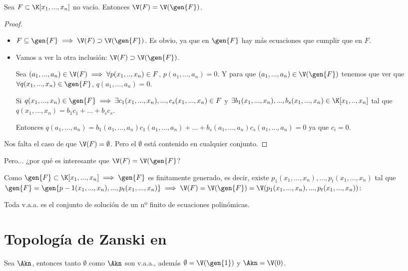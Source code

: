 \begin{prop}
	Sea $F \subset \K[x_1,...,x_n]$ no vacío. Entonces $\V(F)=\V(\gen{F})$.
\end{prop} 

\begin{proof}
	\begin{itemize}
		\item $F \subseteq \gen{F} \implies \V(F) \supset \V(\gen{F})$. Es obvio, ya que en $\gen{F}$ hay más ecuaciones que cumplir que en $F$.
		\item Vamos a ver la otra inclusión: $\V(F) \supset \V(\gen{F})$.
		
		Sea $(a_1,...,a_n) \in \V(F) \implies \forall p(x_1,..,x_n) \in F$, $p(a_1,...,a_n)=0$. Y para que $(a_1,...,a_n) \in \V(\gen{F})$ tenemos que ver que $\forall q(x_1,...,x_n)\in \gen{F}$, $q(a_1,...,a_n)=0$.
		
		Si $q(x_1,...,x_n)\in \gen{F} \implies \exists c_1(x_1,...,x_n),...,c_s(x_1,...,x_n) \in F$ y $\exists b_1(x_1,...,x_n),...,b_s(x_1,...,x_n) \in \K[x_1,..,x_n]$ tal que $q(x_1,...,x_n)=b_1c_1+...+b_sc_s$.
		
		Entonces $q(a_1,...,a_n)=b_1(a_1,...,a_n)c_1(a_1,...,a_n)+...+b_s(a_1,...,a_n)c_s(a_1,...,a_n) = 0$  ya que $c_i=0$.
	\end{itemize}
	
	Nos falta el caso de que $\V(F)=\emptyset$. Pero el $\emptyset$ está contenido en cualquier conjunto.
\end{proof}

Pero... ¿por qué es interesante que $\V(F)=\V(\gen{F}$?

Como $\gen{F}\subset \K[x_1,...,x_n] \implies \gen{F}$ es finitamente generado, es decir, existe $p_1(x_1,...,x_n),...,p_t(x_1,...,x_n)$ tal que $\gen{F} = \gen{p-1(x_1,...,x_n),...,p_t(x_1,...,x_n)} \implies \V(F)=\V(\gen{F})=\V(p_1(x_1,...,x_n),...,p_t(x_1,...,x_n))$:

\obs Toda v.a.a. es el conjunto de solución de un nº finito de ecuaciones polinómicas.

\section{Topología de Zanski en \Akn}
Sea $\Akn$, entonces tanto $\emptyset$ como $\Akn$ son v.a.a., además $\emptyset=\V(\gen{1})$ y $\Akn=\V(0)$.


